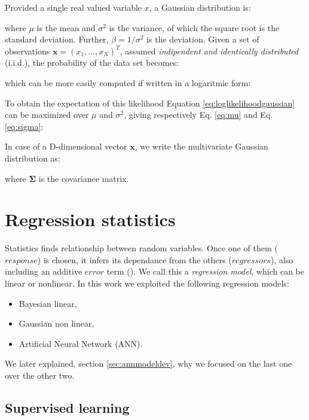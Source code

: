Provided a single real valued variable $x$, a Gaussian distribution is:

where $\mu$ is the mean and $\sigma^2$ is the variance, of which the square root
is the standard deviation.
Further, $\beta = 1/\sigma^2$ is the deviation.
Given a set of observations $\mathbf{x} = (x_1, \ldots, x_N)^T$, assumed
\textit{indipendent and identically distributed} (i.i.d.), the probability of
the data set becomes:

which can be more easily computed if written in a logaritmic form:

To obtain the expectation of this likelihood Equation
\ref{eq:loglikelihoodgaussian} can be maximized over $\mu$ and $\sigma^2$,
giving respectively Eq. \ref{eq:mu} and Eq. \ref{eq:sigma}:


In case of a D-dimensional vector $\mathbf{x}$, we write the multivariate
Gaussian distribution as:

where $\mathbf{\Sigma}$ is the covariance matrix.


\section{Regression statistics}
\label{sec:regressionstatistics}

Statistics finds relationship between random variables.
Once one of them ($response$) is chosen, it infers its dependance from the
others ($regressors$), also including an additive $error$ term
(\citet{RefWorks:194}). We call this a \textit{regression model}, which can be
linear or nonlinear.
In this work we exploited the following regression models:
\begin{itemize}
  \item{Bayesian linear,}
  \item{Gaussian non linear,}
  \item{Artificial Neural Network (\acs{ANN}).}
\end{itemize}
We later explained, section \ref{sec:annmodeldev}, why we focused on the last
one over the other two.

\subsection{Supervised learning}
\label{subsec:supervisedlearning}

